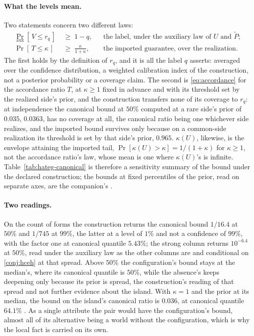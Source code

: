 \documentclass[11pt]{article}
\theoremstyle{definition}
\begin{document}
\paragraph{What the levels mean.} Two statements concern two different laws:
\begin{align}
\Pr_{\mathrm{aux}}[\, V \le r_q \,] \;&\ge\; 1-q, && \text{the label, under the auxiliary law of $U$ and $\tilde P$;} \label{eq:hateg-label}\\
\Pr[\, T \le \kappa \,] \;&\ge\; \frac{\kappa}{1+\kappa}, && \text{the imported guarantee, over the realization.} \label{eq:hateg-guarantee}
\end{align}
The first holds by the definition of $r_q$, and it is all the label $q$ asserts: averaged over the confidence distribution, a weighted calibration index of the construction, not a posterior probability or a coverage claim. The second is \eqref{eq:accordance} for the accordance ratio $T$, at $\kappa \ge 1$ fixed in advance and with its threshold set by the realized side's prior, and the construction transfers none of its coverage to $r_q$: at independence the canonical bound at $50\%$ computed at a rare side's prior of $0.035$, $0.0363$, has no coverage at all, the canonical ratio being one whichever side realizes, and the imported bound survives only because on a common-side realization its threshold is set by that side's prior, $0.965$. $\kappa(U)$, likewise, is the envelope attaining the imported tail, $\Pr[\kappa(U) > \kappa] = 1/(1+\kappa)$ for $\kappa \ge 1$, not the accordance ratio's law, whose mean is one where $\kappa(U)$'s is infinite. Table~\ref{tab:hateg-canonical} is therefore a sensitivity summary of the bound under the declared construction; the bounds at fixed percentiles of the prior, read on separate axes, are the companion's \cite{Nexus}.

\paragraph{Two readings.} On the count of forms the construction returns the canonical bound $1/16.4$ at $50\%$ and $1/745$ at $99\%$, the latter at a level of $1\%$ and not a confidence of $99\%$, with the factor one at canonical quantile $5.43\%$; the strong column returns $10^{-6.4}$ at $50\%$, read under the auxiliary law as the other columns are and conditional on \autoref{conj:hceh} at that spread. Above $50\%$ the configuration's bound stays at the median's, where its canonical quantile is $50\%$, while the absence's keeps deepening only because its prior is spread, the construction's reading of that spread and not further evidence about the island. With $\kappa = 1$ and the prior at its median, the bound on the island's canonical ratio is $0.036$, at canonical quantile $64.1\%$ \cite{Nexus}. As a single attribute the pair would have the configuration's bound, almost all of its alternative being a world without the configuration, which is why the local fact is carried on its own.
\end{document}
